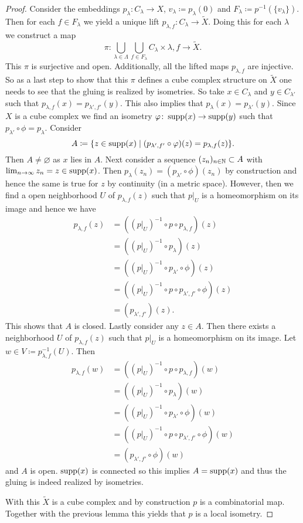 \begin{proof}
  Consider the embeddings \(p_\lambda\colon C_\lambda \to X\), \(v_\lambda \coloneqq p_\lambda(0)\) and \(F_\lambda \coloneqq p^{-1}(\{v_\lambda\})\). Then for each \(f \in F_\lambda\) we yield a unique lift \(p_{\lambda, f}\colon C_\lambda \to \tilde X\).
  Doing this for each \(\lambda\) we construct a map
  \[
    \pi \colon \bigcup_{\lambda \in \Lambda} \bigcup_{f \in F_{\lambda}} C_\lambda \times {\lambda, f} \to \tilde X.
  \]
  This \(\pi\) is surjective and open. Additionally, all the lifted maps \(p_{\lambda, f}\) are injective. So as a last step to show that this \(\pi\) defines a cube complex structure on \(\tilde X\) one needs to see that the gluing is realized by isometries. So take \(x \in C_\lambda\) and \(y \in C_{\lambda'}\) such that \(p_{\lambda,f}(x) = p_{\lambda', f'}(y)\). This also implies that \(p_\lambda(x) = p_{\lambda'}(y)\). Since \(X\) is a cube complex we find an isometry \(\varphi\colon \operatorname{supp}(x) \to \operatorname{supp}(y)\) such that \(p_{\lambda'} \circ \phi  = p_\lambda\). Consider
  \[
    A \coloneqq \{z \in \operatorname{supp}(x) \mid (p_{\lambda', f'} \circ \varphi)(z) = p_{\lambda, f}(z)\}.
  \]
  Then \(A \neq \varnothing\) as \(x\) lies in \(A\). Next consider a sequence \((z_n)_{n \in \mathbb{N}} \subset A\) with \(\lim_{n \to \infty} z_n = z \in \operatorname{supp}(x)\). Then \(p_\lambda(z_n) = (p_{\lambda'} \circ \phi)(z_n)\) by construction and hence the same is true for \(z\) by continuity (in a metric space). However, then we find a open neighborhood \(U\) of \(p_{\lambda,f}(z)\) such that \(p|_U\) is a homeomorphism on its image and hence we have
  \begin{align*}
    p_{\lambda,f}(z)
    & = ((p|_U)^{-1} \circ p \circ p_{\lambda,f})(z)\\
    & = ((p|_U)^{-1} \circ p_\lambda)(z)\\
    & = ((p|_U)^{-1} \circ p_{\lambda'} \circ \phi)(z)\\
    & = ((p|_U)^{-1} \circ p \circ p_{\lambda',f'} \circ \phi)(z)\\
    & = (p_{\lambda', f'} )(z).
  \end{align*}
  This shows that \(A\) is closed. Lastly consider any \(z \in A\). Then there exists a neighborhood \(U\) of \(p_{\lambda, f}(z)\) such that \(p|_U\) is a homeomorphism on its image. Let \(w \in V \coloneqq p_{\lambda, f}^{-1}(U)\). Then
  \begin{align*}
    p_{\lambda,f}(w)
    & = ((p|_U)^{-1} \circ p \circ p_{\lambda,f})(w)\\
    & = ((p|_U)^{-1} \circ p_\lambda)(w)\\
    & = ((p|_U)^{-1} \circ p_{\lambda'} \circ \phi)(w)\\
    & = ((p|_U)^{-1} \circ p \circ p_{\lambda', f'} \circ \phi)(w)\\
    & = (p_{\lambda', f'} \circ \phi)(w)
  \end{align*}
  and \(A\) is open. \(\operatorname{supp}(x)\) is connected so this implies \(A = \operatorname{supp}(x)\) and thus the gluing is indeed realized by isometries.

  With this \(\tilde X\) is a cube complex and by construction \(p\) is a combinatorial map. Together with the previous lemma this yields that \(p\) is a local isometry.
\end{proof}
